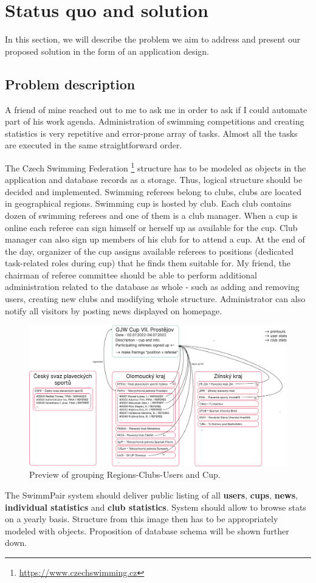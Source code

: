 \chapter{Status quo and solution}
In this section, we will describe the problem we aim to address and present our proposed solution in the form of an application design.
\section{Problem description}
\par
A friend of mine reached out to me to ask me in order to ask if I could automate part of his work agenda. Administration of swimming competitions and creating statistics is very repetitive and error-prone array of tasks. Almost all the tasks are executed in the same straightforward order.
\par
The Czech Swimming Federation \footnote{\url{https://www.czechswimming.cz}} structure has to be modeled as objects in the application and database records as a storage. Thus, logical structure should be decided and implemented. Swimming referees belong to clubs, clubs are located in geographical regions. Swimming cup is hosted by club. Each club contains dozen of swimming referees and one of them is a club manager. When a cup is online each referee can sign himself or herself up as available for the cup. Club manager can also sign up members of his club for to attend a cup. At the end of the day, organizer of the cup assigns available referees to positions (dedicated task-related roles during cup) that he finds them suitable for. My friend, the chairman of referee committee should be able to perform additional administration related to the database as whole - such as adding and removing users, creating new clubs and modifying whole structure. Administrator can also notify all visitors by posting news displayed on homepage.
\begin{figure}[h]
\includegraphics[scale=0.335]{img/swimmpair_schema.png}
\caption{Preview of grouping Regions-Clubs-Users and Cup.}
\label{fig1.1:grouping}
\end{figure}
The SwimmPair system should deliver public listing of all \textbf{users}, \textbf{cups}, \textbf{news}, \textbf{individual statistics} and \textbf{club statistics}. System should allow to browse stats on a yearly basis. Structure from this image then has to be appropriately modeled with objects. Proposition of database schema will be shown further down. 
